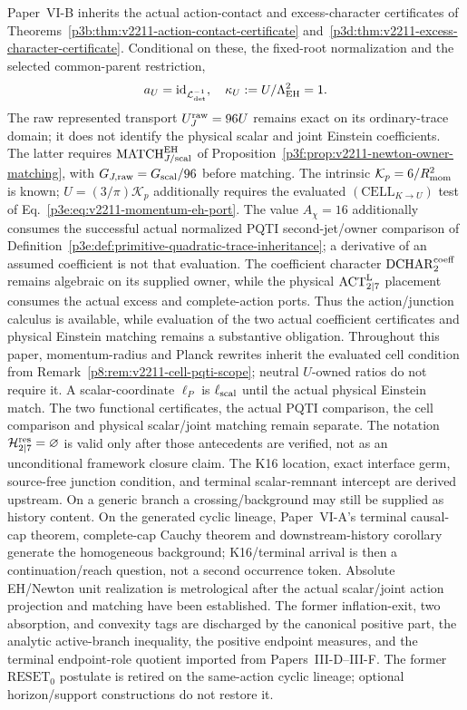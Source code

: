 \documentclass[12pt,a4paper]{article}
\begin{document}
\begin{remark}
\label{p9:rem:inherited-residual-frontier}
Paper~VI-B inherits the actual action-contact and excess-character
certificates of Theorems~\ref{p3b:thm:v2211-action-contact-certificate}
and~\ref{p3d:thm:v2211-excess-character-certificate}. Conditional on these,
the fixed-root normalization and the selected common-parent restriction,
\[
 a_U=\operatorname{id}_{\mathcal L_{\det}^{-1}},\quad
 \kappa_U:=U/\Lambda_{\rm EH}^2=1.
\]
The raw represented transport $U_J^{\rm raw}=96U$ remains exact on its
ordinary-trace domain; it does not identify the physical scalar and joint
Einstein coefficients. The latter requires
$\mathrm{MATCH}_{J/\mathrm{scal}}^{\rm EH}$ of
Proposition~\ref{p3f:prop:v2211-newton-owner-matching}, with
$G_{J,\mathrm{raw}}=G_{\rm scal}/96$ before matching. The intrinsic
$\mathcal K_p=6/R_{\mathrm{mom}}^2$ is known; $U=(3/\pi)\mathcal K_p$ additionally
requires the evaluated $(\mathrm{CELL}_{K\to U})$ test of
Eq.~\eqref{p3e:eq:v2211-momentum-eh-port}.
The value $A_\chi=16$ additionally consumes the successful actual normalized
PQTI second-jet/owner comparison of
Definition~\ref{p3e:def:primitive-quadratic-trace-inheritance}; a derivative
of an assumed coefficient is not that evaluation. The coefficient character
$\mathrm{DCHAR}_{2}^{\rm coeff}$ remains algebraic on its supplied owner,
while the physical $\mathrm{ACT}_{2\mid7}^{\rm L}$ placement consumes the
actual excess and complete-action ports. Thus the action/junction calculus is
available, while evaluation of the two actual coefficient certificates and
physical Einstein matching remains a substantive obligation. Throughout
this paper, momentum-radius and Planck rewrites inherit the evaluated cell
condition from Remark~\ref{p8:rem:v2211-cell-pqti-scope}; neutral $U$-owned
ratios do not require it. A scalar-coordinate $\ell_P$ is
$\ell_{\rm scal}$ until the actual physical Einstein match. The two
functional certificates, the actual PQTI comparison, the cell comparison and
physical scalar/joint matching remain separate. The notation
$\mathcal H_{2\mid7}^{\rm res}=\varnothing$ is valid only after those
antecedents are verified, not as an unconditional framework closure claim.
The K16 location, exact interface germ, source-free junction condition, and terminal scalar-remnant intercept are derived upstream.  On a generic branch a crossing/background may still be supplied as history content.  On the generated cyclic lineage, Paper~VI-A's terminal causal-cap theorem,
complete-cap Cauchy theorem and downstream-history corollary generate the
homogeneous background; K16/terminal arrival is then a continuation/reach question, not a second occurrence token.  Absolute EH/Newton unit realization is metrological after the actual
scalar/joint action projection and matching have been established.  The former
inflation-exit, two absorption, and convexity tags are discharged by the
canonical positive part, the analytic active-branch inequality, the positive
endpoint measures, and the terminal endpoint-role quotient imported from
Papers~III-D--III-F.  The former \(\mathrm{RESET}_0\) postulate is retired on
the same-action cyclic lineage; optional horizon/support constructions do not
restore it.


\end{remark}
\end{document}
